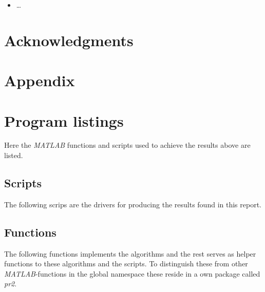 \documentclass[10pt, a4paper]{article}
\newcommand{\matlab}{\small{\emph{MATLAB\textsuperscript{\textregistered}}}}
\begin{document}
\begin{itemize}
	\item \ldots
\end{itemize}


\section{Acknowledgments}

{}


\newpage
\section*{Appendix}
\appendix
\section{Program listings} \label{appendix+programs}
Here the \matlab{} functions and scripts used to achieve the results above are listed.

\subsection{Scripts}
The following scrips are the drivers for producing the results found in this report.



\subsection{Functions}
The following functions implements the algorithms and the rest serves as helper functions to these algorithms and the scripts. To distinguish these from other \matlab{}-functions in the global namespace these reside in a own package called \emph{pr2}.

%

\cite{forward+error}
\end{document}
